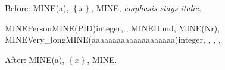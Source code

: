 \documentclass{article}
\newcommand\set[1]{\left\{#1\right\}}
\newcommand\pkey[1]{MINE(#1)}
\newcommand\relation{MINE}
\begin{document}
Before: \pkey{a}, $\set{x}$, \relation, \emph{emphasis stays italic}.
\begin{relationalschema}
  \relation{Person}{\pkey{PID}{integer}, , }
  \relation{Hund}{, \pkey{Nr}{}, }
  \relation{Very\_long}{\pkey{aaaaaaaaaaaaaaaaaaaa}{integer}, ,
    , , }
\end{relationalschema}
After: \pkey{a}, $\set{x}$, \relation.
\end{document}
